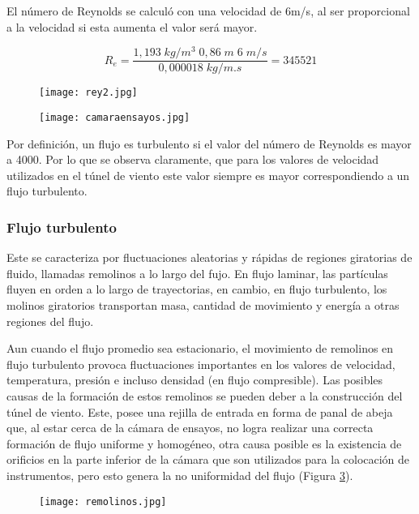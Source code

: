 El número de Reynolds se calculó con una velocidad de 6m/s, al ser proporcional a la velocidad si esta aumenta el valor será mayor.

\begin{equation}	
	R_e=\frac{1,193\;kg/m^{3}\;0,86\;m\;6\;m/s}{0,000018\;kg/m.s}=345521
	\label{reyn2}
\end{equation}	

\begin{figure}[htb]
	\centering
	\texttt{[image: rey2.jpg]}
	\label{fig:rey2}
\end{figure}


\begin{figure}[htb]
	\centering
	\texttt{[image: camaraensayos.jpg]}
	\label{fig:camens}
\end{figure}



Por definición, un flujo es turbulento si el valor del número de Reynolds es mayor a 4000. Por lo que se observa claramente, que para los valores de velocidad utilizados en el túnel de viento este valor siempre es mayor correspondiendo a un flujo turbulento.

\subsubsection{Flujo turbulento}
\begin{tcolorbox}[colback=blue!5!white,colframe=blue!75!black,title=Flujo turbulento]
	Este se caracteriza por fluctuaciones aleatorias y rápidas de regiones giratorias de fluido, llamadas remolinos a lo largo del fujo. En flujo laminar, las partículas fluyen en orden a lo largo de trayectorias, en cambio, en flujo turbulento, los molinos giratorios transportan masa, cantidad de movimiento y energía a otras regiones del flujo. \cite{yunus2006mecanica}
	
\end{tcolorbox}

Aun cuando el flujo promedio sea estacionario, el movimiento de remolinos en flujo turbulento provoca fluctuaciones importantes en los valores de velocidad, temperatura, presión e incluso densidad (en flujo compresible). Las posibles causas de la formación de estos remolinos se pueden deber a la construcción del túnel de viento. Este, posee una rejilla de entrada en forma de panal de abeja que, al estar cerca de la cámara de ensayos, no logra realizar una correcta formación de flujo uniforme y homogéneo, otra causa posible es la existencia de orificios en la parte inferior de la cámara que son utilizados para la colocación de instrumentos, pero esto genera la no uniformidad del flujo (Figura \ref{fig:remolinos}).
\begin{figure}[htb]
	\centering
	\texttt{[image: remolinos.jpg]}
	\label{fig:remolinos}
\end{figure}




